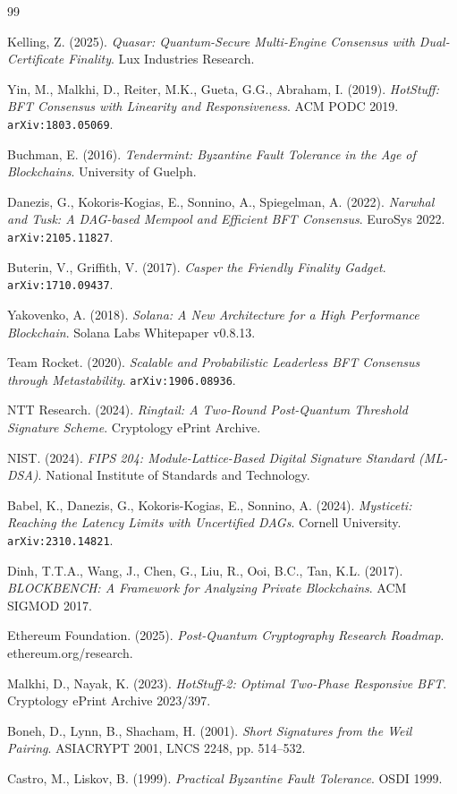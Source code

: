 \documentclass[11pt]{article}
\begin{document}
\begin{thebibliography}{99}

Kelling, Z. (2025).
\textit{Quasar: Quantum-Secure Multi-Engine Consensus with Dual-Certificate Finality}.
Lux Industries Research.

Yin, M., Malkhi, D., Reiter, M.K., Gueta, G.G., Abraham, I. (2019).
\textit{HotStuff: BFT Consensus with Linearity and Responsiveness}.
ACM PODC 2019. \texttt{arXiv:1803.05069}.

Buchman, E. (2016).
\textit{Tendermint: Byzantine Fault Tolerance in the Age of Blockchains}.
University of Guelph.

Danezis, G., Kokoris-Kogias, E., Sonnino, A., Spiegelman, A. (2022).
\textit{Narwhal and Tusk: A DAG-based Mempool and Efficient BFT Consensus}.
EuroSys 2022. \texttt{arXiv:2105.11827}.

Buterin, V., Griffith, V. (2017).
\textit{Casper the Friendly Finality Gadget}.
\texttt{arXiv:1710.09437}.

Yakovenko, A. (2018).
\textit{Solana: A New Architecture for a High Performance Blockchain}.
Solana Labs Whitepaper v0.8.13.

Team Rocket. (2020).
\textit{Scalable and Probabilistic Leaderless BFT Consensus through Metastability}.
\texttt{arXiv:1906.08936}.

NTT Research. (2024).
\textit{Ringtail: A Two-Round Post-Quantum Threshold Signature Scheme}.
Cryptology ePrint Archive.

NIST. (2024).
\textit{FIPS 204: Module-Lattice-Based Digital Signature Standard (ML-DSA)}.
National Institute of Standards and Technology.

Babel, K., Danezis, G., Kokoris-Kogias, E., Sonnino, A. (2024).
\textit{Mysticeti: Reaching the Latency Limits with Uncertified DAGs}.
Cornell University. \texttt{arXiv:2310.14821}.

Dinh, T.T.A., Wang, J., Chen, G., Liu, R., Ooi, B.C., Tan, K.L. (2017).
\textit{BLOCKBENCH: A Framework for Analyzing Private Blockchains}.
ACM SIGMOD 2017.

Ethereum Foundation. (2025).
\textit{Post-Quantum Cryptography Research Roadmap}.
ethereum.org/research.

Malkhi, D., Nayak, K. (2023).
\textit{HotStuff-2: Optimal Two-Phase Responsive BFT}.
Cryptology ePrint Archive 2023/397.

Boneh, D., Lynn, B., Shacham, H. (2001).
\textit{Short Signatures from the Weil Pairing}.
ASIACRYPT 2001, LNCS 2248, pp. 514--532.

Castro, M., Liskov, B. (1999).
\textit{Practical Byzantine Fault Tolerance}.
OSDI 1999.

\end{thebibliography}
\end{document}

